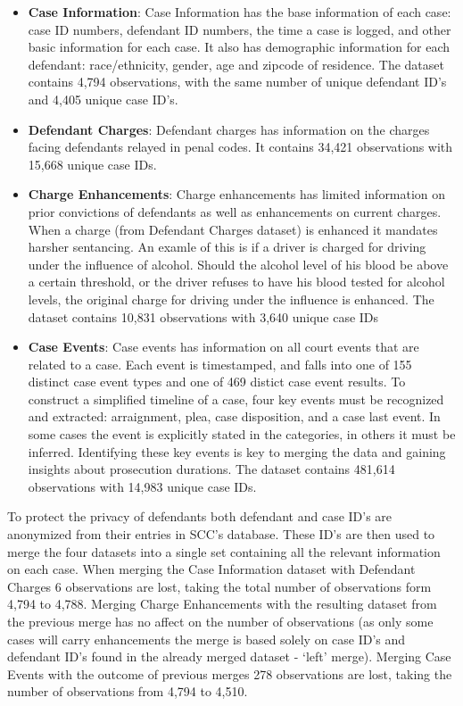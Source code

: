 \documentclass{AISB2008}
\begin{document}
\begin{itemize}
\tightlist
\item
  \textbf{Case Information}: Case Information has the base information
  of each case: case ID numbers, defendant ID numbers, the time a case
  is logged, and other basic information for each case. It also has
  demographic information for each defendant: race/ethnicity, gender,
  age and zipcode of residence. The dataset contains 4,794 observations,
  with the same number of unique defendant ID's and 4,405 unique case
  ID's.
\item
  \textbf{Defendant Charges}: Defendant charges has information on the
  charges facing defendants relayed in penal codes. It contains 34,421
  observations with 15,668 unique case IDs.
\item
  \textbf{Charge Enhancements}: Charge enhancements has limited
  information on prior convictions of defendants as well as enhancements
  on current charges. When a charge (from Defendant Charges dataset) is
  enhanced it mandates harsher sentancing. An examle of this is if a
  driver is charged for driving under the influence of alcohol. Should
  the alcohol level of his blood be above a certain threshold, or the
  driver refuses to have his blood tested for alcohol levels, the
  original charge for driving under the influence is enhanced. The
  dataset contains 10,831 observations with 3,640 unique case IDs
\item
  \textbf{Case Events}: Case events has information on all court events
  that are related to a case. Each event is timestamped, and falls into
  one of 155 distinct case event types and one of 469 distict case event
  results. To construct a simplified timeline of a case, four key events
  must be recognized and extracted: arraignment, plea, case disposition,
  and a case last event. In some cases the event is explicitly stated in
  the categories, in others it must be inferred. Identifying these key
  events is key to merging the data and gaining insights about
  prosecution durations. The dataset contains 481,614 observations with
  14,983 unique case IDs.
\end{itemize}

To protect the privacy of defendants both defendant and case ID's are
anonymized from their entries in SCC's database. These ID's are then
used to merge the four datasets into a single set containing all the
relevant information on each case. When merging the Case Information
dataset with Defendant Charges 6 observations are lost, taking the total
number of observations form 4,794 to 4,788. Merging Charge Enhancements
with the resulting dataset from the previous merge has no affect on the
number of observations (as only some cases will carry enhancements the
merge is based solely on case ID's and defendant ID's found in the
already merged dataset - `left' merge). Merging Case Events with the
outcome of previous merges 278 observations are lost, taking the number
of observations from 4,794 to 4,510.
\end{document}
